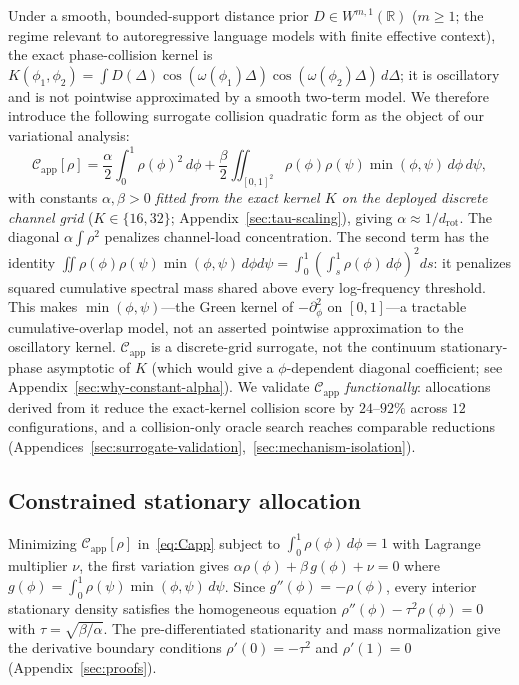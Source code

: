 Under a smooth, bounded-support distance prior $D \in W^{m,1}(\mathbb{R})$ ($m\geq 1$; the regime relevant to autoregressive language models with finite effective context), the exact phase-collision kernel is $K(\phi_1,\phi_2) = \int D(\Delta)\cos(\omega(\phi_1)\Delta)\cos(\omega(\phi_2)\Delta)\,d\Delta$; it is oscillatory and is not pointwise approximated by a smooth two-term model. We therefore introduce the following surrogate collision quadratic form as the object of our variational analysis:
\begin{equation}
\mathcal{C}_{\mathrm{app}}[\rho]
=
\frac{\alpha}{2}\!\int_0^1\! \rho(\phi)^2\,d\phi
+
\frac{\beta}{2}\!\iint_{[0,1]^2}\! \rho(\phi)\rho(\psi)\min(\phi,\psi)\,d\phi\,d\psi,
\label{eq:Capp}
\end{equation}
with constants $\alpha,\beta>0$ \emph{fitted from the exact kernel $K$ on the deployed discrete channel grid} ($K{\in}\{16,32\}$; Appendix~\ref{sec:tau-scaling}), giving $\alpha{\approx}1/d_{\mathrm{rot}}$. The diagonal $\alpha\!\int\!\rho^2$ penalizes channel-load concentration. The second term has the identity $\iint\rho(\phi)\rho(\psi)\min(\phi,\psi)\,d\phi d\psi=\int_0^1(\int_s^1\rho(\phi)\,d\phi)^2ds$: it penalizes squared cumulative spectral mass shared above every log-frequency threshold. This makes $\min(\phi,\psi)$---the Green kernel of $-\partial_\phi^2$ on $[0,1]$---a tractable cumulative-overlap model, not an asserted pointwise approximation to the oscillatory kernel. $\mathcal{C}_{\mathrm{app}}$ is a discrete-grid surrogate, not the continuum stationary-phase asymptotic of $K$ (which would give a $\phi$-dependent diagonal coefficient; see Appendix~\ref{sec:why-constant-alpha}). We validate $\mathcal{C}_{\mathrm{app}}$ \emph{functionally}: allocations derived from it reduce the exact-kernel collision score by $24$--$92\%$ across $12$ configurations, and a collision-only oracle search reaches comparable reductions (Appendices~\ref{sec:surrogate-validation},~\ref{sec:mechanism-isolation}).

\subsection{Constrained stationary allocation}
\label{sec:ode}

Minimizing $\mathcal{C}_{\mathrm{app}}[\rho]$ in~\eqref{eq:Capp} subject to $\int_0^1\rho(\phi)\,d\phi = 1$ with Lagrange multiplier $\nu$, the first variation gives $\alpha\rho(\phi) + \beta\,g(\phi) + \nu = 0$ where $g(\phi) = \int_0^1\rho(\psi)\min(\phi,\psi)\,d\psi$. Since $g''(\phi) = -\rho(\phi)$, every interior stationary density satisfies the homogeneous equation $\rho''(\phi) - \tau^2\rho(\phi) = 0$ with $\tau = \sqrt{\beta/\alpha}$. The pre-differentiated stationarity and mass normalization give the derivative boundary conditions $\rho'(0) = -\tau^2$ and $\rho'(1) = 0$ (Appendix~\ref{sec:proofs}).

